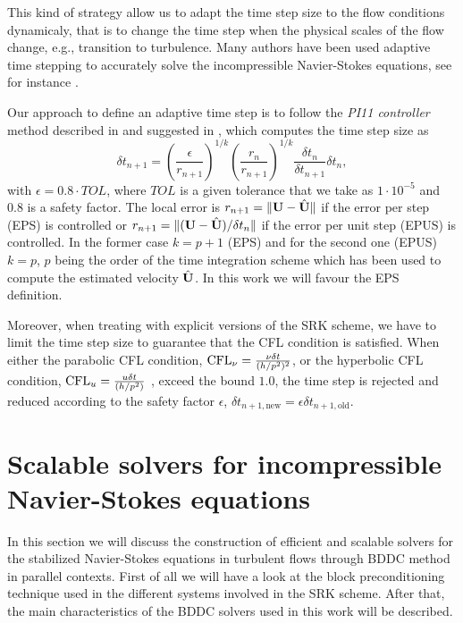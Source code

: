 This kind of strategy allow us to adapt the time step size to the flow conditions dynamicaly, that is to change the time step when the physical scales of the flow change, e.g., transition to turbulence. Many authors have been used adaptive time stepping to accurately solve the incompressible Navier-Stokes equations, see for instance \cite{feng_time-adaptive_2000,john_adaptive_2010,kay_adaptive_2010,veneziani_aladins:_2013}.

Our approach to define an adaptive time step is to follow the \textit{PI11 controller} method described in \cite{soderlind_automatic_2002} and suggested in \cite{gustafsson_control-theoretic_1994}, which computes the time step size as
$$\delta t_{n+1}=\left(\frac{\epsilon}{r_{n+1}}\right)^{1/k}\left(\frac{r_n}{r_{n+1}}\right)^{1/k}\frac{\delta t_n}{\delta t_{n+1}}\delta t_n,$$
with $\epsilon=0.8\cdot TOL$, where $TOL$ is a given tolerance that we take as $1\cdot10^{-5}$ and $0.8$ is a safety factor. The local error is $r_{n+1}=\|{\bf U}-\hat{{\bf U}}\|$ if the error per step (EPS) is controlled or $r_{n+1}=\|({\bf U}-\hat{{\bf U}})/\delta t_n\|$ if the error per unit step (EPUS) is controlled. In the former case $k=p+1$ (EPS) and for the second one (EPUS) $k=p$, $p$ being the order of the time integration scheme which has been used to compute the estimated velocity $\hat{{\bf U}}$. In this work we will favour the EPS definition.

Moreover, when treating with explicit versions of the SRK scheme, we have to limit the time step size to guarantee that the CFL condition is satisfied. When either the parabolic CFL condition, ${\rm CFL}_\nu=\frac{\nu\delta t}{(h/p^2)^2}$, or the hyperbolic CFL condition, ${\rm CFL}_u =\frac{u\delta t}{(h/p^2)}$ , exceed the bound $ 1.0 $, the time step is rejected and reduced according to the safety factor $ \epsilon $, $ \delta t_{n+1,\mbox{new}}=\epsilon\delta t_{n+1,\mbox{old}} $.

\section{Scalable solvers for incompressible Navier-Stokes equations}
\label{sec-C7_solver}
In this section we will discuss the construction of efficient and scalable solvers for the stabilized Navier-Stokes equations in turbulent flows through BDDC method in parallel contexts. First of all we will have a look at the block preconditioning technique used in the different systems involved in the SRK scheme. After that, the main characteristics of the BDDC solvers used in this work will be described.

